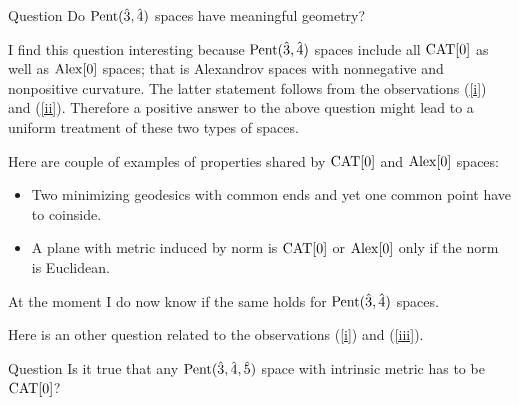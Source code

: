\documentclass{article}
\begin{document}
\begin{thm}{Question}
 Do $\text{\rm Pent}(\hat 3,\hat 4)$ spaces have meaningful geometry?
\end{thm}

I find this question interesting 
because $\text{\rm Pent}(\hat 3,\hat 4)$ spaces include  all $\mathrm{CAT}[0]$ as well as $\mathrm{Alex}[0]$ spaces; that is Alexandrov spaces with nonnegative and nonpositive curvature.
The latter statement follows from the observations (\ref{i}) and (\ref{ii}).
Therefore a positive answer to the above question might lead to a uniform treatment of these two types of spaces.

Here are couple of examples of properties shared by $\mathrm{CAT}[0]$ and $\mathrm{Alex}[0]$ spaces:
\begin{itemize}
\item Two minimizing geodesics with common ends and yet one common point have to coinside.
\item A plane with metric induced by norm is $\mathrm{CAT}[0]$ or $\mathrm{Alex}[0]$ only if the norm is Euclidean.
\end{itemize}
At the moment I do now know if the same holds for $\text{\rm Pent}(\hat 3,\hat 4)$ spaces.

Here is an other question related to the observations (\ref{i}) and (\ref{iii}).

\begin{thm}{Question}
Is it true that any $\text{\rm Pent}(\hat 3,\hat 4,\hat 5)$ space with intrinsic metric has to be $\mathrm{CAT}[0]$?
\end{thm} 
\end{document}

